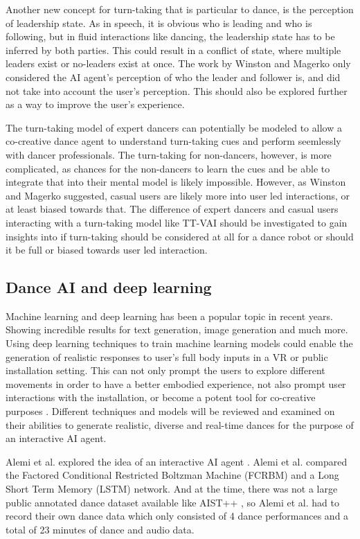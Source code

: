Another new concept for turn-taking that is particular to dance, is the
perception of leadership state. As in speech, it is obvious who is
leading and who is following, but in fluid interactions like dancing,
the leadership state has to be inferred by both parties. This could
result in a conflict of state, where multiple leaders exist or
no-leaders exist at once. The work by Winston and Magerko only
considered the AI agent's perception of who the leader and follower is,
and did not take into account the user's perception. This should also be
explored further as a way to improve the user's experience.

The turn-taking model of expert dancers can potentially be modeled to
allow a co-creative dance agent to understand turn-taking cues and
perform seemlessly with dancer professionals. The turn-taking for
non-dancers, however, is more complicated, as chances for the
non-dancers to learn the cues and be able to integrate that into their
mental model is likely impossible. However, as Winston and Magerko
suggested, casual users are likely more into user led interactions, or
at least biased towards that. The difference of expert dancers and
casual users interacting with a turn-taking model like TT-VAI should be
investigated to gain insights into if turn-taking should be considered
at all for a dance robot or should it be full or biased towards user led interaction.

\subsection{Dance AI and deep learning}

Machine learning and deep learning has been a popular topic in recent
years. Showing incredible results for text generation, image generation
and much more.  Using deep learning techniques to train machine learning
models could enable the generation of realistic responses to user's full
body inputs in a VR or public installation setting.  This can not only
prompt the users to explore different movements in order to have a
better embodied experience, not also prompt user interactions with the
installation, or become a potent tool for co-creative purposes
\cite{Wallace2023}.  Different techniques and models will be reviewed
and examined on their abilities to generate realistic, diverse and
real-time dances for the purpose of an interactive AI agent.

Alemi et al. explored the idea of an interactive AI agent
\cite{Alemi2017}. Alemi et al. compared the Factored Conditional
Restricted Boltzman Machine (FCRBM) and a Long Short Term Memory (LSTM)
network. And at the time, there was not a large public annotated dance
dataset available like AIST++ \cite{Li2021}, so Alemi et al. had to
record their own dance data which only consisted of 4 dance performances
and a total of 23 minutes of dance and audio data.

